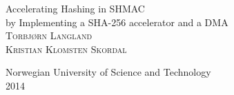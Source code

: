 \documentclass[a4paper]{report}
\begin{document}
\begin{titlepage}
	\begin{center}
		{\huge Accelerating Hashing in SHMAC}\\[0.5cm]
		{\large by Implementing a SHA-256 accelerator and a DMA}\\[3.5cm]

		\textsc{Torbjørn Langland}\\
		\textsc{Kristian Klomsten Skordal}

		\vfill
		{\large Norwegian University of Science and Technology}\\[0.2em]
		{2014}
	\end{center}
\end{titlepage}



\tableofcontents


%









\end{document}
